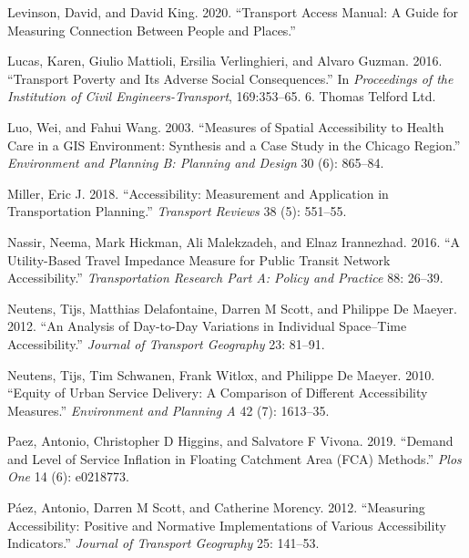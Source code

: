 \documentclass[
  letterpaper,
  DIV=11,
  numbers=noendperiod]{scrreprt}
\newlength{\cslhangindent}
\newlength{\cslentryspacingunit} %
\newenvironment{CSLReferences}[2] %
 {%
  \setlength{\parindent}{0pt}
  \ifodd #1
  \let\oldpar\par
  \def\par{\hangindent=\cslhangindent\oldpar}
  \fi
  \setlength{\parskip}{#2\cslentryspacingunit}
 }%
 {}
\begin{document}
\begin{CSLReferences}{1}{0}
\leavevmode{}%
Levinson, David, and David King. 2020. {``Transport Access Manual: A
Guide for Measuring Connection Between People and Places.''}

\leavevmode{}%
Lucas, Karen, Giulio Mattioli, Ersilia Verlinghieri, and Alvaro Guzman.
2016. {``Transport Poverty and Its Adverse Social Consequences.''} In
\emph{Proceedings of the Institution of Civil Engineers-Transport},
169:353--65. 6. Thomas Telford Ltd.

\leavevmode{}%
Luo, Wei, and Fahui Wang. 2003. {``Measures of Spatial Accessibility to
Health Care in a GIS Environment: Synthesis and a Case Study in the
Chicago Region.''} \emph{Environment and Planning B: Planning and
Design} 30 (6): 865--84.

\leavevmode{}%
Miller, Eric J. 2018. {``Accessibility: Measurement and Application in
Transportation Planning.''} \emph{Transport Reviews} 38 (5): 551--55.

\leavevmode{}%
Nassir, Neema, Mark Hickman, Ali Malekzadeh, and Elnaz Irannezhad. 2016.
{``A Utility-Based Travel Impedance Measure for Public Transit Network
Accessibility.''} \emph{Transportation Research Part A: Policy and
Practice} 88: 26--39.

\leavevmode{}%
Neutens, Tijs, Matthias Delafontaine, Darren M Scott, and Philippe De
Maeyer. 2012. {``An Analysis of Day-to-Day Variations in Individual
Space--Time Accessibility.''} \emph{Journal of Transport Geography} 23:
81--91.

\leavevmode{}%
Neutens, Tijs, Tim Schwanen, Frank Witlox, and Philippe De Maeyer. 2010.
{``Equity of Urban Service Delivery: A Comparison of Different
Accessibility Measures.''} \emph{Environment and Planning A} 42 (7):
1613--35.

\leavevmode{}%
Paez, Antonio, Christopher D Higgins, and Salvatore F Vivona. 2019.
{``Demand and Level of Service Inflation in Floating Catchment Area
(FCA) Methods.''} \emph{Plos One} 14 (6): e0218773.

\leavevmode{}%
Páez, Antonio, Darren M Scott, and Catherine Morency. 2012. {``Measuring
Accessibility: Positive and Normative Implementations of Various
Accessibility Indicators.''} \emph{Journal of Transport Geography} 25:
141--53.


\end{CSLReferences}
\end{document}

